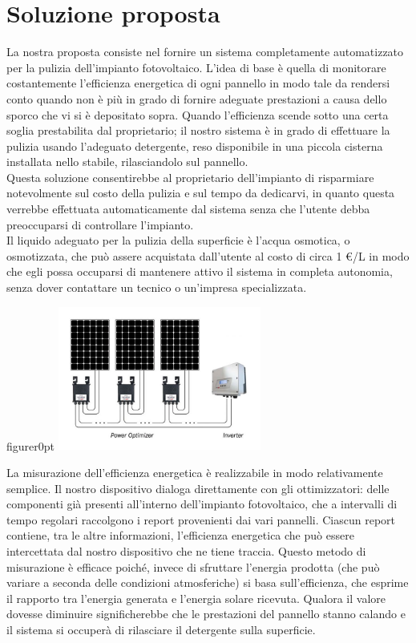 \documentclass[a4paper, 12pt]{article}
\begin{document}
	\section{Soluzione proposta}
	La nostra proposta consiste nel fornire un sistema completamente automatizzato per la pulizia dell'impianto fotovoltaico. L'idea di base è quella di monitorare costantemente l'efficienza energetica di ogni pannello in modo tale da rendersi conto quando non è più in grado di fornire adeguate prestazioni a causa dello sporco che vi si è depositato sopra. Quando l'efficienza scende sotto una certa soglia prestabilita dal proprietario; il nostro sistema è in grado di effettuare la pulizia usando l'adeguato detergente, reso disponibile in una piccola cisterna installata nello stabile, rilasciandolo sul pannello.\\
	Questa soluzione consentirebbe al proprietario dell'impianto di risparmiare notevolmente sul costo della pulizia e sul tempo da dedicarvi, in quanto questa verrebbe effettuata automaticamente dal sistema senza che l'utente debba preoccuparsi di controllare l'impianto.\\
	Il liquido adeguato per la pulizia della superficie è l'acqua osmotica, o osmotizzata, che può assere acquistata dall'utente al costo di circa 1 \euro/L in modo che egli possa occuparsi di mantenere attivo il sistema in completa autonomia, senza dover contattare un tecnico o un'impresa specializzata.\\
	\begin{wrapfloat}{figure}{r}{0pt}
		\includegraphics[width=0.5\textwidth]{Images/ottimizzatori.jpg}
	\end{wrapfloat}
	La misurazione dell'efficienza energetica è realizzabile in modo relativamente semplice. Il nostro dispositivo dialoga direttamente con gli ottimizzatori: delle componenti già presenti all'interno dell'impianto fotovoltaico, che a intervalli di tempo regolari raccolgono i report provenienti dai vari pannelli. Ciascun report contiene, tra le altre informazioni, l'efficienza energetica che può essere intercettata dal nostro dispositivo che ne tiene traccia. Questo metodo di misurazione è efficace poiché, invece di sfruttare l'energia prodotta (che può variare a seconda delle condizioni atmosferiche) si basa sull'efficienza, che esprime il rapporto tra l'energia generata e l'energia solare ricevuta. Qualora il valore dovesse diminuire significherebbe che le prestazioni del pannello stanno calando e il sistema si occuperà di rilasciare il detergente sulla superficie.
\end{document}
